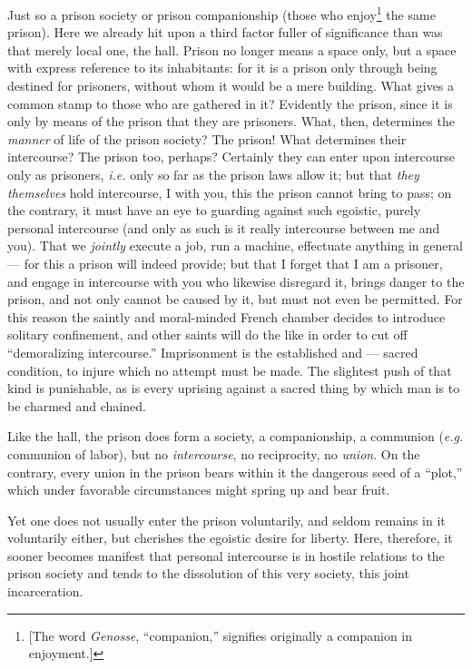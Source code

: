 Just so a prison society or prison companionship (those who 
enjoy\footnote{[The word \textit{Genosse}, ``companion,'' signifies 
originally a companion in enjoyment.]} the same prison). Here we already hit 
upon a third factor fuller of significance than was that merely local one, the 
hall. Prison no longer means a space only, but a space with express reference 
to its inhabitants: for it is a prison only through being destined for 
prisoners, without whom it would be a mere building. What gives a common stamp 
to those who are gathered in it? Evidently the prison, since it is only by 
means of the prison that they are prisoners. What, then, determines the 
\textit{manner} of life of the prison society? The prison! What determines 
their intercourse? The prison too, perhaps? Certainly they can enter upon 
intercourse only as prisoners, \textit{i.e.} only so far as the prison laws 
allow it; but that \textit{they themselves} hold intercourse, I with you, this 
the prison cannot bring to pass; on the contrary, it must have an eye to 
guarding against such egoistic, purely personal intercourse (and only as such 
is it really intercourse between me and you). That we \textit{jointly} execute 
a job, run a machine, effectuate anything in general --- for this a prison will 
indeed provide; but that I forget that I am a prisoner, and engage in 
intercourse with you who likewise disregard it, brings danger to the prison, 
and not only cannot be caused by it, but must not even be permitted. For this 
reason the saintly and moral-minded French chamber decides to introduce 
solitary confinement, and other saints will do the like in order to cut off 
``demoralizing intercourse.'' Imprisonment is the established and --- sacred 
condition, to injure which no attempt must be made. The slightest push of that 
kind is punishable, as is every uprising against a sacred thing by which man 
is to be charmed and chained.

Like the hall, the prison does form a society, a companionship, a communion 
(\textit{e.g.} communion of labor), but no \textit{intercourse}, no 
reciprocity, no \textit{union}. On the contrary, every union in the prison 
bears within it the dangerous seed of a ``plot,'' which under favorable 
circumstances might spring up and bear fruit.

Yet one does not usually enter the prison voluntarily, and seldom remains in 
it voluntarily either, but cherishes the egoistic desire for liberty. Here, 
therefore, it sooner becomes manifest that personal intercourse is in hostile 
relations to the prison society and tends to the dissolution of this very 
society, this joint incarceration.

